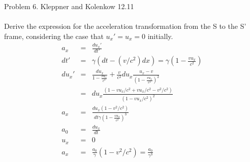 \documentclass[11pt]{amsart}
\begin{document}
Problem 6. Kleppner and Kolenkow 12.11 \\ \\
Derive the expression for the acceleration transformation from the S to the S' frame, considering the case that $u_{x}'=u_{x}=0$ initially. \\
\begin{eqnarray*}
a_{x} &=& \frac{du_{x}'}{dt'} \\
dt' &=& \gamma(dt-(v/c^{2})dx) = \gamma(1-\frac{vu_{x}}{c^{2}}) \\
du_{x}' &=& \frac{du_{x}}{1-\frac{vu_{x}}{c^{2}}}+\frac{v}{c^{2}}du_{x}\frac{u_{x}-v}{(1-\frac{vu_{x}}{c^{2}})^{2}} \\
&=& du_{x}\frac{(1-vu_{x}/c^{2}+vu_{x}/c^{2}-v^{2}/c^{2})}{(1-vu_{x}/c^{2})^{2}} \\
a_{x} &=& \frac{du_{x}(1-v^{2}/c^{2})}{dt\gamma(1-\frac{vu_{x}}{c^{2}})^{3}} \\
a_{0} &=& \frac{du_{x}}{dt} \\
u_{x} &=& 0 \\
a_{x} &=& \frac{a_{0}}{\gamma}(1-v^{2}/c^{2}) = \frac{a_{0}}{\gamma^{3}} 
\end{eqnarray*} \\
\end{document}
